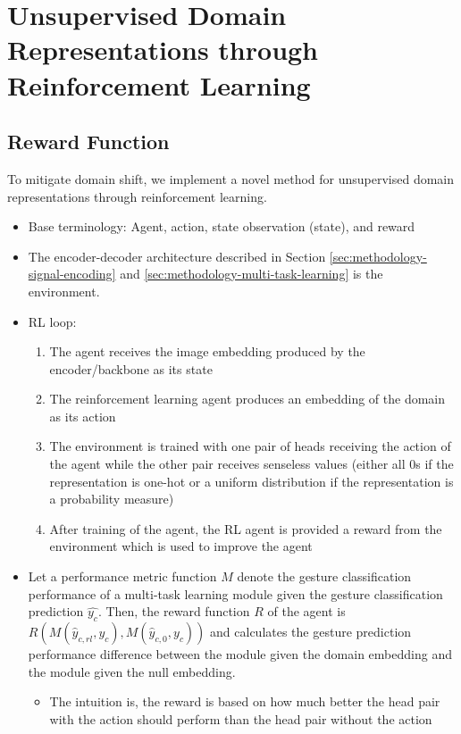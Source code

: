 \section{Unsupervised Domain Representations through Reinforcement Learning}\label{sec:methodology-rl}

\subsection{Reward Function}\label{subsec:methodology-reward}
To mitigate domain shift, we implement a novel method for unsupervised domain representations through reinforcement learning.

\begin{itemize}
	\item Base terminology: Agent, action, state observation (state), and reward
	\item The encoder-decoder architecture described in Section \ref{sec:methodology-signal-encoding} and \ref{sec:methodology-multi-task-learning} is the environment.
	\item RL loop:
	\begin{enumerate}
		\item The agent receives the image embedding produced by the encoder/backbone as its state
		\item The reinforcement learning agent produces an embedding of the domain as its action
		\item The environment is trained with one pair of heads receiving the action of the agent while the other pair receives senseless values (either all 0s if the representation is one-hot or a uniform distribution if the representation is a probability measure)
		\item After training of the agent, the RL agent is provided a reward from the environment which is used to improve the agent
	\end{enumerate}
	\item Let a performance metric function $M$ denote the gesture classification performance of a multi-task learning module given the gesture classification prediction $\hat{y_{c}}$. Then, the reward function $R$ of the agent is $R\left(M\left(\hat{y}_{c,rl}, y_c\right),M\left(\hat{y}_{c,0}, y_c\right)\right)$ and calculates the gesture prediction performance difference between the module given the domain embedding and the module given the null embedding.
	\begin{itemize}
		\item The intuition is, the reward is based on how much better the head pair with the action should perform than the head pair without the action

\end{itemize}
\end{itemize}
